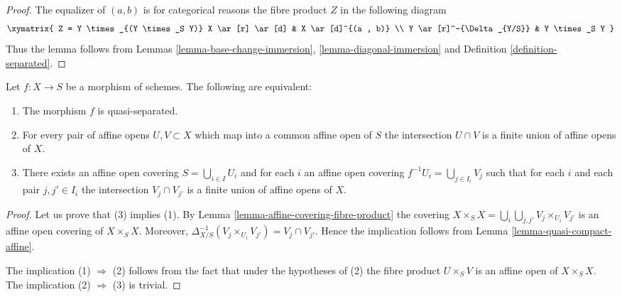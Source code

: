 \begin{proof}
The equalizer of $(a, b)$ is for categorical reasons
the fibre product $Z$ in the following diagram
$$
\xymatrix{
Z = Y \times_{(Y \times_S Y)} X \ar[r] \ar[d] &
 X \ar[d]^{(a , b)} \\
Y \ar[r]^-{\Delta_{Y/S}} & Y \times_S Y
}
$$
Thus the lemma follows from Lemmas
\ref{lemma-base-change-immersion}, \ref{lemma-diagonal-immersion} and
Definition \ref{definition-separated}.
\end{proof}

\begin{lemma}
\label{lemma-characterize-quasi-separated}
Let $f : X \to S$ be a morphism of schemes.
The following are equivalent:
\begin{enumerate}
\item The morphism $f$ is quasi-separated.
\item For every pair of affine opens $U, V \subset X$
which map into a common affine open of $S$ the intersection
$U \cap V$ is a finite union of affine opens of $X$.
\item There exists an affine open covering $S = \bigcup_{i \in I} U_i$
and for each $i$ an affine open covering $f^{-1}U_i = \bigcup_{j \in I_i} V_j$
such that for each $i$ and each pair $j, j' \in I_i$ the
intersection $V_j \cap V_{j'}$ is a finite union of affine
opens of $X$.
\end{enumerate}
\end{lemma}

\begin{proof}
Let us prove that (3) implies (1).
By Lemma \ref{lemma-affine-covering-fibre-product}
the covering $X \times_S X = \bigcup_i \bigcup_{j, j'} V_j \times_{U_i} V_{j'}$
is an affine open covering of $X \times_S X$.
Moreover, $\Delta_{X/S}^{-1}(V_j \times_{U_i} V_{j'}) = V_j \cap V_{j'}$.
Hence the implication follows from Lemma \ref{lemma-quasi-compact-affine}.

\medskip\noindent
The implication (1) $\Rightarrow$ (2) follows from the fact
that under the hypotheses of (2) the fibre product
$U \times_S V$ is an affine open of $X \times_S X$.
The implication (2) $\Rightarrow$ (3) is trivial.
\end{proof}

